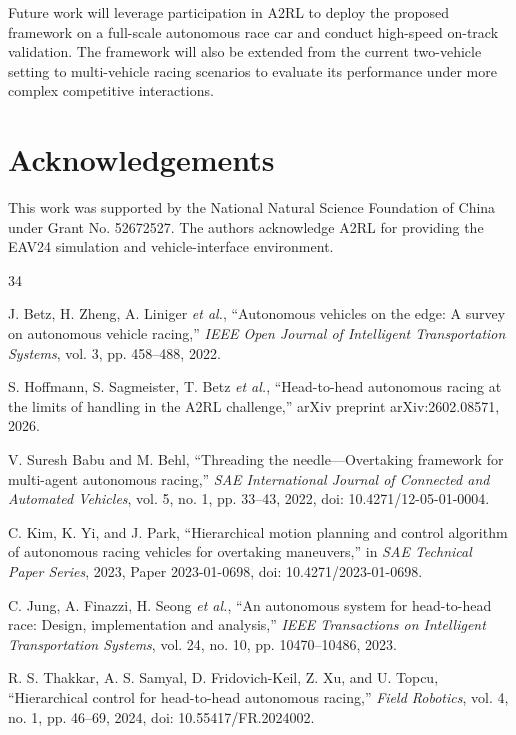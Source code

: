\documentclass[journal,twoside,web]{ieeecolor}
\begin{document}
Future work will leverage participation in A2RL to deploy the proposed framework on a full-scale autonomous race car and conduct high-speed on-track validation. The framework will also be extended from the current two-vehicle setting to multi-vehicle racing scenarios to evaluate its performance under more complex competitive interactions.




\section*{Acknowledgements}
This work was supported by the National Natural Science Foundation of China under Grant No. 52672527.
The authors acknowledge A2RL for providing the EAV24 simulation and vehicle-interface environment.


\begin{thebibliography}{34}

J. Betz, H. Zheng, A. Liniger \emph{et al.},
``Autonomous vehicles on the edge: A survey on autonomous vehicle racing,''
\emph{IEEE Open Journal of Intelligent Transportation Systems}, vol. 3,
pp. 458--488, 2022.

S. Hoffmann, S. Sagmeister, T. Betz \emph{et al.},
``Head-to-head autonomous racing at the limits of handling in the A2RL
challenge,'' arXiv preprint arXiv:2602.08571, 2026.

V. Suresh Babu and M. Behl,
``Threading the needle---Overtaking framework for multi-agent autonomous
racing,'' \emph{SAE International Journal of Connected and Automated
Vehicles}, vol. 5, no. 1, pp. 33--43, 2022,
doi: 10.4271/12-05-01-0004.

C. Kim, K. Yi, and J. Park,
``Hierarchical motion planning and control algorithm of autonomous racing
vehicles for overtaking maneuvers,'' in \emph{SAE Technical Paper Series},
2023, Paper 2023-01-0698, doi: 10.4271/2023-01-0698.

C. Jung, A. Finazzi, H. Seong \emph{et al.},
``An autonomous system for head-to-head race: Design, implementation and
analysis,'' \emph{IEEE Transactions on Intelligent Transportation Systems},
vol. 24, no. 10, pp. 10470--10486, 2023.

R. S. Thakkar, A. S. Samyal, D. Fridovich-Keil, Z. Xu, and U. Topcu,
``Hierarchical control for head-to-head autonomous racing,''
\emph{Field Robotics}, vol. 4, no. 1, pp. 46--69, 2024,
doi: 10.55417/FR.2024002.


\end{thebibliography}
\end{document}
